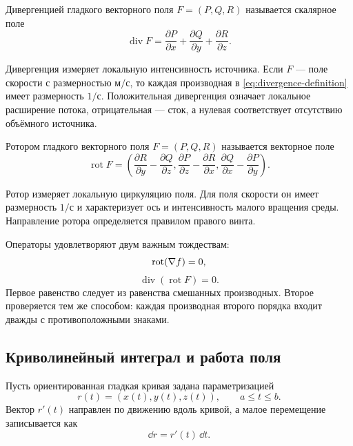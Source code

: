 \begin{definition}
Дивергенцией гладкого векторного поля $F=(P,Q,R)$ называется скалярное поле
\begin{equation}
\label{eq:divergence-definition}
\operatorname{div}F
=
\frac{\partial P}{\partial x}
+
\frac{\partial Q}{\partial y}
+
\frac{\partial R}{\partial z}.
\end{equation}
\end{definition}

Дивергенция измеряет локальную интенсивность источника. Если $F$ --- поле скорости с размерностью $\text{м}/\text{с}$, то каждая производная в \eqref{eq:divergence-definition} имеет размерность $1/\text{с}$. Положительная дивергенция означает локальное расширение потока, отрицательная --- сток, а нулевая соответствует отсутствию объёмного источника.

\begin{definition}
Ротором гладкого векторного поля $F=(P,Q,R)$ называется векторное поле
\begin{equation}
\label{eq:curl-definition}
\operatorname{rot}F
=
\left(
\frac{\partial R}{\partial y}-\frac{\partial Q}{\partial z},
\frac{\partial P}{\partial z}-\frac{\partial R}{\partial x},
\frac{\partial Q}{\partial x}-\frac{\partial P}{\partial y}
\right).
\end{equation}
\end{definition}

Ротор измеряет локальную циркуляцию поля. Для поля скорости он имеет размерность $1/\text{с}$ и характеризует ось и интенсивность малого вращения среды. Направление ротора определяется правилом правого винта.

Операторы удовлетворяют двум важным тождествам:
\begin{equation}
\label{eq:curl-grad-zero}
\operatorname{rot}(\nabla f)=0,
\end{equation}
\begin{equation}
\label{eq:div-curl-zero}
\operatorname{div}(\operatorname{rot}F)=0.
\end{equation}
Первое равенство следует из равенства смешанных производных. Второе проверяется тем же способом: каждая производная второго порядка входит дважды с противоположными знаками.

\subsection{Криволинейный интеграл и работа поля}

Пусть ориентированная гладкая кривая задана параметризацией
\[
r(t)=(x(t),y(t),z(t)),
\qquad
a\leq t\leq b.
\]
Вектор $r'(t)$ направлен по движению вдоль кривой, а малое перемещение записывается как
\[
\dd r=r'(t)\,\dd t.
\]

